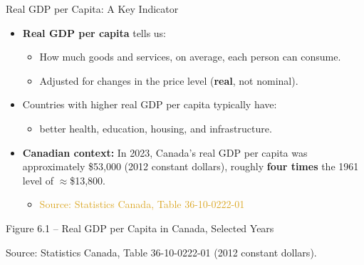 \documentclass[aspectratio=169]{beamer}
\begin{document}
\begin{frame}{Real GDP per Capita: A Key Indicator}
\transfade
\begin{itemize}
  \item \textbf{Real GDP per capita} tells us:
  \begin{itemize}
    \item How much goods and services, on average, each person can consume.
    \item Adjusted for changes in the price level (\textbf{real}, not nominal).
  \end{itemize}
  \item Countries with higher real GDP per capita typically have:
  \begin{itemize}
    \item better health, education, housing, and infrastructure.
  \end{itemize}
  \item \textbf{Canadian context:} In 2023, Canada's real GDP per capita was approximately \alert{\$53,000} (2012 constant dollars), roughly \textbf{four times} the 1961 level of $\approx$\$13,800.
  \begin{itemize}
    \item \textcolor{goldenrod}{Source: Statistics Canada, Table 36-10-0222-01}
  \end{itemize}
\end{itemize}
\end{frame}

\begin{frame}{Figure 6.1 -- Real GDP per Capita in Canada, Selected Years}
\begin{center}
\end{center}
{\tiny Source: Statistics Canada, Table 36-10-0222-01 (2012 constant dollars).}
\end{frame}
\end{document}
